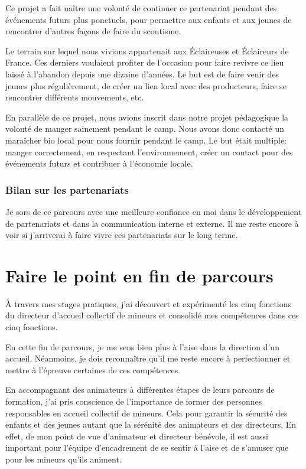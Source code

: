 \documentclass[titlepage,11pt,a4paper]{article}
\begin{document}
Ce projet a fait naître une volonté de continuer ce partenariat pendant des événements
futurs plus ponctuels, pour permettre aux enfants et aux jeunes de rencontrer d'autres
façons de faire du scoutisme.

Le terrain sur lequel nous vivions appartenait aux Éclaireuses et Éclaireurs de France. Ces
derniers voulaient profiter de l'occasion pour faire revivre ce lieu laissé à l'abandon
depuis une dizaine d'années. Le but est de faire venir des jeunes plus régulièrement, de
créer un lien local avec des producteurs, faire se rencontrer différents mouvements, etc.

En parallèle de ce projet, nous avions inscrit dans notre projet pédagogique la volonté de
manger sainement pendant le camp. Nous avons donc contacté un maraîcher bio local pour nous
fournir pendant le camp. Le but était multiple: manger correctement, en respectant
l'environnement, créer un contact pour des événements futurs et contribuer à l'économie
locale.

\subsubsection{Bilan sur les partenariats}

Je sors de ce parcours avec une meilleure confiance en moi dans le développement
de partenariats et dans la communication interne et externe. Il me reste encore à voir
si j'arriverai à faire vivre ces partenariats sur le long terme.

\clearpage
\section{Faire le point en fin de parcours}

À travers mes stages pratiques, j'ai découvert et expérimenté les cinq fonctions du directeur d'accueil
collectif de mineurs et consolidé mes compétences dans ces cinq fonctions.

En cette fin de parcours, je me sens bien plus à l'aise dans la direction d'un accueil.
Néanmoins, je dois reconnaître qu'il me reste encore à
perfectionner et mettre à l'épreuve certaines de ces compétences.

En accompagnant des animateurs à différentes étapes de leurs parcours de formation, j'ai
pris conscience de l'importance de former des personnes
responsables en accueil collectif de mineurs\@. Cela pour garantir la sécurité des enfants et des jeunes autant que
la sérénité des animateurs et des directeurs. En effet, de mon point de vue d'animateur et
directeur bénévole, il est aussi important pour l'équipe d'encadrement de se sentir à
l'aise et de s'amuser que pour les mineurs qu'ils animent.
\end{document}
